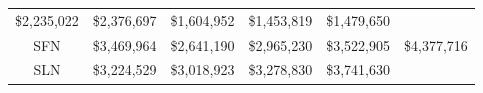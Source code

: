 \documentclass[]{book}
\theoremstyle{definition}
\theoremstyle{definition}
\theoremstyle{definition}
\theoremstyle{remark}
\begin{document}
\begin{longtable}[]{@{}cccccc@{}}
\begin{minipage}[t]{0.15\columnwidth}
\$2,235,022\strut
\end{minipage} & \begin{minipage}[t]{0.15\columnwidth}\centering
\$2,376,697\strut
\end{minipage} & \begin{minipage}[t]{0.15\columnwidth}\centering
\$1,604,952\strut
\end{minipage} & \begin{minipage}[t]{0.15\columnwidth}\centering
\$1,453,819\strut
\end{minipage} & \begin{minipage}[t]{0.15\columnwidth}\centering
\$1,479,650\strut
\end{minipage}\tabularnewline
\begin{minipage}[t]{0.09\columnwidth}\centering
SFN\strut
\end{minipage} & \begin{minipage}[t]{0.15\columnwidth}\centering
\$3,469,964\strut
\end{minipage} & \begin{minipage}[t]{0.15\columnwidth}\centering
\$2,641,190\strut
\end{minipage} & \begin{minipage}[t]{0.15\columnwidth}\centering
\$2,965,230\strut
\end{minipage} & \begin{minipage}[t]{0.15\columnwidth}\centering
\$3,522,905\strut
\end{minipage} & \begin{minipage}[t]{0.15\columnwidth}\centering
\$4,377,716\strut
\end{minipage}\tabularnewline
\begin{minipage}[t]{0.09\columnwidth}\centering
SLN\strut
\end{minipage} & \begin{minipage}[t]{0.15\columnwidth}\centering
\$3,224,529\strut
\end{minipage} & \begin{minipage}[t]{0.15\columnwidth}\centering
\$3,018,923\strut
\end{minipage} & \begin{minipage}[t]{0.15\columnwidth}\centering
\$3,278,830\strut
\end{minipage} & \begin{minipage}[t]{0.15\columnwidth}\centering
\$3,741,630\strut
\end{minipage} & \begin{minipage}[t]{0.15\columnwidth}\centering

\end{minipage}
\end{longtable}
\end{document}
